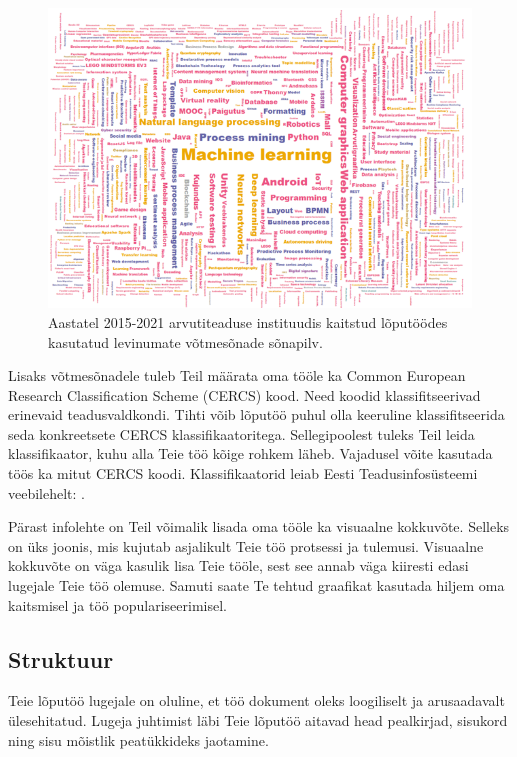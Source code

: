 \begin{figure}[h]
    \centering
    \captionsetup{justification=centering}
    \includegraphics[width=\textwidth]{figures/Joonis1-Võtmesõnad.png}
    \caption{Aastatel 2015-2021 arvutiteaduse instituudis kaitstud lõputöödes kasutatud levinumate võtmesõnade sõnapilv.}
    \label{fig:võtmesõnad}
\end{figure}

Lisaks võtmesõnadele tuleb Teil määrata oma tööle ka Common European Research Classification Scheme (CERCS) kood. Need koodid klassifitseerivad erinevaid teadusvaldkondi. Tihti võib lõputöö puhul olla keeruline klassifitseerida seda konkreetsete CERCS klassifikaatoritega. Sellegipoolest tuleks Teil leida klassifikaator, kuhu alla Teie töö kõige rohkem läheb. Vajadusel võite kasutada töös ka mitut CERCS koodi. Klassifikaatorid leiab Eesti Teadusinfosüsteemi veebilehelt: . 

Pärast infolehte on Teil võimalik lisada oma tööle ka visuaalne kokkuvõte. Selleks on üks joonis, mis kujutab asjalikult Teie töö protsessi ja tulemusi. Visuaalne kokkuvõte on väga kasulik lisa Teie tööle, sest see annab väga kiiresti edasi lugejale Teie töö olemuse. Samuti saate Te tehtud graafikat kasutada hiljem oma kaitsmisel ja töö populariseerimisel.

\subsection{Struktuur}
Teie lõputöö lugejale on oluline, et töö dokument oleks loogiliselt ja arusaadavalt ülesehitatud. Lugeja juhtimist läbi Teie lõputöö aitavad head pealkirjad, sisukord ning sisu mõistlik peatükkideks jaotamine.

